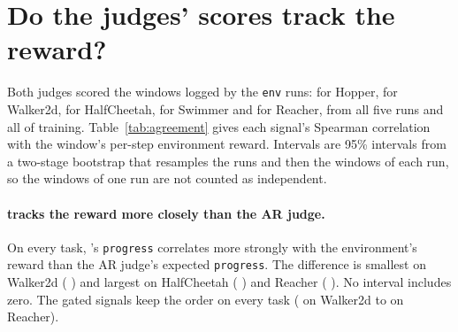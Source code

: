 
\section{Do the judges' scores track the reward?}\label{sec:agreement}

Both judges scored the windows logged by the \texttt{env} runs:  for Hopper, 
for Walker2d,  for HalfCheetah,  for Swimmer and  for
Reacher, from all five runs and all of training. Table~\ref{tab:agreement} gives each signal's Spearman correlation with
the window's per-step environment reward. Intervals are 95\% intervals from a two-stage bootstrap that resamples the
runs and then the windows of each run, so the windows of one run are not counted as independent.

\begin{table}[t]
\centering\small

\caption{Spearman correlation of each judge signal with the per-step environment reward of the window, on windows
logged by the \texttt{env} runs (all seeds, all of training). \emph{progress}: the expected level divided by four;
\emph{healthy}: $p(\text{yes})$; \emph{gated}: their product; \emph{sampled}: a level drawn from the AR judge's
distribution, as an AR judge answering in text at temperature one would give it.}
\label{tab:agreement}
\end{table}

\paragraph{\kev{} tracks the reward more closely than the AR judge.} On every task, \kev{}'s \texttt{progress}
correlates more strongly with the environment's reward than the AR judge's expected \texttt{progress}. The difference
is smallest on Walker2d (
) and largest on
HalfCheetah (
) and Reacher
(
). No interval includes
zero. The gated signals keep the order on every task ( on Walker2d to
 on Reacher).

